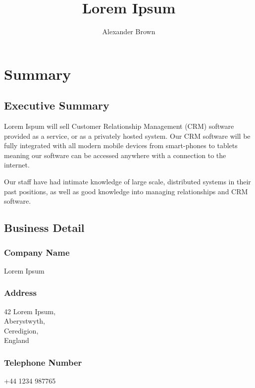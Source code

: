 \documentclass[DIV=calc, paper=a4, fontsize=11pt]{scrartcl}	 %
\title{Lorem Ipsum} %
\author{Alexander Brown } %
\date{} %
\begin{document}
\maketitle %

\thispagestyle{fancy} %

\tableofcontents
\newpage


\section{Summary}

\subsection{Executive Summary}
Lorem Ispum will sell Customer Relationship Management (CRM) software provided as a service, or
as a privately hosted system. Our CRM software will be fully integrated with all modern mobile
devices from smart-phones to tablets meaning our software can be accessed anywhere with a 
connection to the internet.

Our staff have had intimate knowledge of large scale, distributed systems in their past positions,
as well as good knowledge into managing relationships and CRM software.

\subsection{Business Detail}
\subsubsection*{Company Name}
Lorem Ipsum

\subsubsection*{Address}
42 Lorem Ipsum,\\
Aberystwyth,\\
Ceredigion,\\
England

\subsubsection*{Telephone Number}
+44 1234 987765
\end{document}

